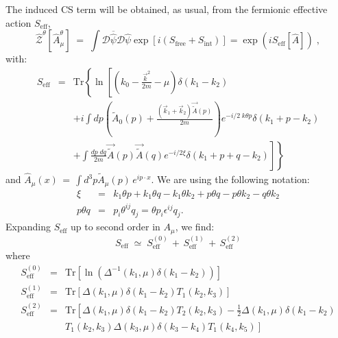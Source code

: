 \documentclass[a4paper,12pt]{article}
\begin{document}
The induced CS term will be obtained, as usual, from the fermionic effective action 
$S_{\mathrm{eff}}$,
\begin{equation}
\widehat{\mathcal{Z}}^\theta [{\widehat A}^\theta_\mu]\;=\; 
\int \mathcal{D}{\overline {\widehat\psi}} \mathcal{D}{\widehat \psi}
\exp \left[ i(S_\mathrm{free}+S_\mathrm{int}) \right] = 
\exp \left( iS_\mathrm{eff}[{\widehat A}] \right)\;,
\end{equation}
with:
\begin{eqnarray}
S_{\mathrm{eff}} & = & \mathrm{Tr} \left\{ \ln \left[
 (k_0-\frac{\vec{k}^2}{2m} - \mu)
 \delta(k_1-k_2) \right. \right. \nonumber \\ 
& &  + i \int dp \left(  \tilde A_0(p)  + \frac{(\vec{k}_1+\vec{k}_2) \vec{
 \tilde A} (p)} {2m} \right)
e^{-i/2 \; k\theta p}
 \delta(k_1+p-k_2)
 \nonumber \\
&  &
\left.\left.
+\int \frac{dp\;dq}{2m} \vec{\tilde A}(p)\vec{\tilde A}(q)
e^{-i/2 \xi}
 \delta(k_1+p+q-k_2)
\right]\right\}
\end{eqnarray}
and ${\widehat A}_\mu(x)\,=\,\int d^3p {\widetilde A}_\mu (p) \, e^{i p\cdot x}$. We
are using the following notation:
\begin{eqnarray*}
\xi & = & k_1 \theta p  + k_1 \theta q - k_1\theta k_2
      +p \theta q - p\theta k_2
      -q\theta k_2 \\
p \theta q & =  & p_i \theta ^{ij} q_j = \theta p_i \epsilon ^{ij} q_j .
\end{eqnarray*}
Expanding $S_{\mathrm{eff}}$ up to second order in $A_\mu$, we find:
\begin{equation}
S_{\mathrm{eff}} \;\simeq\;S_{\mathrm{eff}}^{(0)}\,+\, S_{\mathrm{eff}}^{(1)}\,+\, S_{\mathrm{eff}}^{(2)}
\end{equation}
where
\begin{eqnarray}
S_{\mathrm{eff}}^{(0)} & = & \mathrm{Tr} \left[
\ln \left(
\Delta^{-1}(k_1,\mu)\delta(k_1-k_2)
\right) \right]
\\
S_{\mathrm{eff}}^{(1)} & = & \mathrm{Tr} 
\left[
\Delta(k_1,\mu) \delta (k_1-k_2)
T_1(k_2,k_3)
\right]
\\
S_{\mathrm{eff}}^{(2)} & = &
\mathrm{Tr}
\left[
\Delta(k_1,\mu)\delta(k_1-k_2)T_2(k_2,k_3)-\frac{1}{2}\Delta(k_1,\mu)\delta(k_1-k_2)
\right.
\nonumber \\
& & 
\left.
T_1(k_2,k_3)\Delta(k_3,\mu)\delta(k_3-k_4)T_1(k_4,k_5)
\right]
\end{eqnarray}
\end{document}
